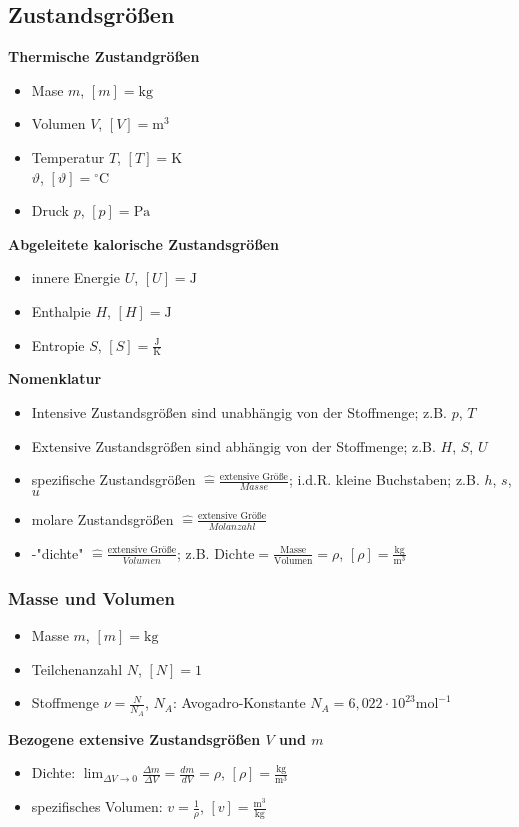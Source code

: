 \documentclass[10pt,a4paper]{article}
\begin{document}
\subsection{Zustandsgrößen}

\textbf{Thermische Zustandgrößen}
\begin{itemize}
\item Mase $m$, $[m] = \text{kg}$
\item Volumen $V$, $[V] = \text{m}^3$
\item Temperatur $T$, $[T] = \text{K}$ \\
\phantom{Temperatur} $\vartheta$, $[\vartheta] = {^\circ} \text{C}$
\item Druck $p$, $[p] = \text{Pa}$
\end{itemize}
\textbf{Abgeleitete kalorische Zustandsgrößen}
\begin{itemize}
\item innere Energie $U$, $[U] = \text{J}$
\item Enthalpie $H$, $[H] = \text{J}$
\item Entropie $S$, $[S] = \frac{\text{J}}{\text{K}}$
\end{itemize}
\textbf{Nomenklatur}
\begin{itemize}
\item Intensive Zustandsgrößen sind unabhängig von der Stoffmenge; z.B. $p$, $T$
\item Extensive Zustandsgrößen sind abhängig von der Stoffmenge; z.B. $H$, $S$, $U$
\item spezifische Zustandsgrößen $\widehat{=} \frac{\text{extensive Größe}}{Masse}$; i.d.R. kleine Buchstaben; z.B. $h$, $s$, $u$
\item molare Zustandsgrößen $\widehat{=} \frac{\text{extensive Größe}}{Molanzahl}$
\item -"dichte" $\widehat{=} \frac{\text{extensive Größe}}{Volumen}$; z.B. $\text{Dichte} = \frac{\text{Masse}}{\text{Volumen}} = \rho$, $[\rho] = \frac{\text{kg}}{\text{m}^3}$
\end{itemize}

\subsubsection{Masse und Volumen}

\begin{itemize}
\item Masse $m$, $[m] = \text{kg}$
\item Teilchenanzahl $N$, $[N] = 1$
\item Stoffmenge $\nu = \frac{N}{N_A}$, $N_A$: Avogadro-Konstante $N_A = 6,022 \cdot 10^{23} \text{mol}^{-1}$
\end{itemize}
\textbf{Bezogene extensive Zustandsgrößen $V$ und $m$}
\begin{itemize}
\item Dichte: $\lim_{\Delta V \rightarrow 0} \frac{\Delta m}{\Delta V} = \frac{dm}{dV} = \rho$, $[\rho] = \frac{\text{kg}}{\text{m}^3}$
\item spezifisches Volumen: $v = \frac{1}{\rho}$, $[v] = \frac{\text{m}^3}{\text{kg}}$
\end{itemize}
\end{document}
